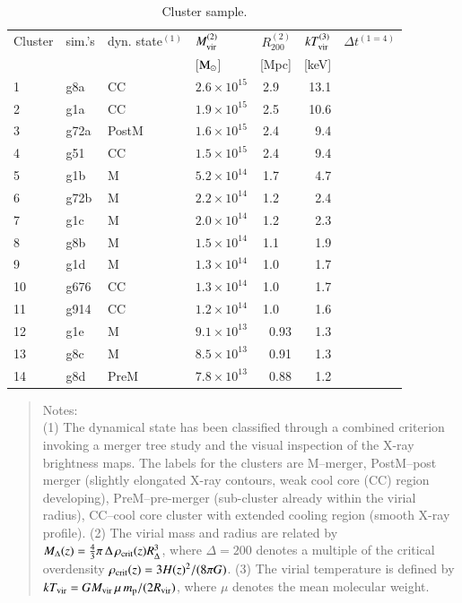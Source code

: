 \documentclass[useAMS,usenatbib]{mn2e}
\newcommand{\p}{\mathrm{p}}
\newcommand{\rvir}{R_{200}}
\begin{document}
\begin{table}
\caption{Cluster sample.}
\begin{tabular}{l l l l r r r}
\hline
\hline
Cluster & sim.'s & dyn. state$^{(1)}$ & $M_{\rm vir}^{(2)}$ & $\rvir^{(2)}$ & $kT_{\rm vir}^{(3)}$ & $\Delta t$$^{(1=4)}$\\
& & & [${\mathrm{M}}_\odot$] & [Mpc] & [keV] & \\
\hline
1  & g8a  & CC    & $2.6\times 10^{15}$ &   2.9~~ & 13.1 \\
2  & g1a  & CC    & $1.9\times 10^{15}$ &   2.5~~ & 10.6 \\
3  & g72a & PostM & $1.6\times 10^{15}$ &   2.4~~ & 9.4  \\
4  & g51  & CC    & $1.5\times 10^{15}$ &   2.4~~ & 9.4  \\
                                                     
5  & g1b  & M     & $5.2\times 10^{14}$ &   1.7~~ & 4.7  \\
6  & g72b & M     & $2.2\times 10^{14}$ &   1.2~~ & 2.4  \\
7  & g1c  & M     & $2.0\times 10^{14}$ &   1.2~~ & 2.3  \\
8  & g8b  & M     & $1.5\times 10^{14}$ &   1.1~~ & 1.9  \\
9  & g1d  & M     & $1.3\times 10^{14}$ &   1.0~~ & 1.7  \\
                                                     
10 & g676 & CC    & $1.3\times 10^{14}$ &   1.0~~ & 1.7  \\
11 & g914 & CC    & $1.2\times 10^{14}$ &   1.0~~ & 1.6  \\
12 & g1e  & M     & $9.1\times 10^{13}$ &  0.93   & 1.3  \\
13 & g8c  & M     & $8.5\times 10^{13}$ &  0.91   & 1.3  \\
14 & g8d  & PreM  & $7.8\times 10^{13}$ &  0.88   & 1.2  \\
\hline
\end{tabular}  \begin{quote}
 Notes:\\ (1) The dynamical state has been classified through a combined
 criterion invoking a merger tree study and the visual inspection of the X-ray
 brightness maps. The labels for the clusters are M--merger, PostM--post
 merger (slightly elongated X-ray contours, weak cool core (CC) region developing),
 PreM--pre-merger (sub-cluster already within the virial radius), CC--cool
 core cluster with extended cooling region (smooth X-ray profile).  (2) The
 virial mass and radius are related by $M_\Delta(z) = \frac{4}{3} \pi\,
 \Delta\, \rho_{\mathrm{crit}}(z) R_\Delta^3 $, where $\Delta=200$ denotes a
 multiple of the critical overdensity $\rho_{\mathrm{crit}}(z) = 3 H (z)^2/ (8\pi
 G)$.  (3) The virial temperature is defined by $kT_{\rm vir} = G M_{\rm vir} \,
 \mu\, m_\p / (2 R_{\rm vir})$, where $\mu$ denotes the mean molecular weight.
\end{quote}
\label{tab:cluster_sample}
\end{table}
\end{document}
